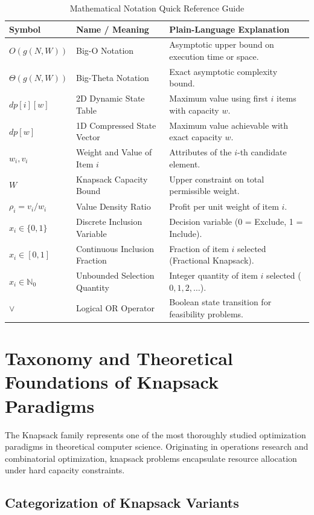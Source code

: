 \documentclass[10pt,journal,compsoc,onecolumn]{IEEEtran}
\begin{document}
\begin{table}[htbp]
\centering
\caption{Mathematical Notation Quick Reference Guide}
\label{tab:math-symbols}
\begin{tabular}{lll}
\toprule
\textbf{Symbol} & \textbf{Name / Meaning} & \textbf{Plain-Language Explanation} \\
\midrule
$O(g(N, W))$ & Big-O Notation & Asymptotic upper bound on execution time or space. \\
$\Theta(g(N, W))$ & Big-Theta Notation & Exact asymptotic complexity bound. \\
$dp[i][w]$ & 2D Dynamic State Table & Maximum value using first $i$ items with capacity $w$. \\
$dp[w]$ & 1D Compressed State Vector & Maximum value achievable with exact capacity $w$. \\
$w_i, v_i$ & Weight and Value of Item $i$ & Attributes of the $i$-th candidate element. \\
$W$ & Knapsack Capacity Bound & Upper constraint on total permissible weight. \\
$\rho_i = v_i / w_i$ & Value Density Ratio & Profit per unit weight of item $i$. \\
$x_i \in \{0, 1\}$ & Discrete Inclusion Variable & Decision variable (0 = Exclude, 1 = Include). \\
$x_i \in [0, 1]$ & Continuous Inclusion Fraction & Fraction of item $i$ selected (Fractional Knapsack). \\
$x_i \in \mathbb{N}_0$ & Unbounded Selection Quantity & Integer quantity of item $i$ selected ($0, 1, 2, \dots$). \\
$\lor$ & Logical OR Operator & Boolean state transition for feasibility problems. \\
\bottomrule
\end{tabular}
\end{table}


\section{Taxonomy and Theoretical Foundations of Knapsack Paradigms}
\label{sec:knapsack-foundations}

The Knapsack family represents one of the most thoroughly studied optimization paradigms in theoretical computer science. Originating in operations research and combinatorial optimization, knapsack problems encapsulate resource allocation under hard capacity constraints.

\subsection{Categorization of Knapsack Variants}
\end{document}
